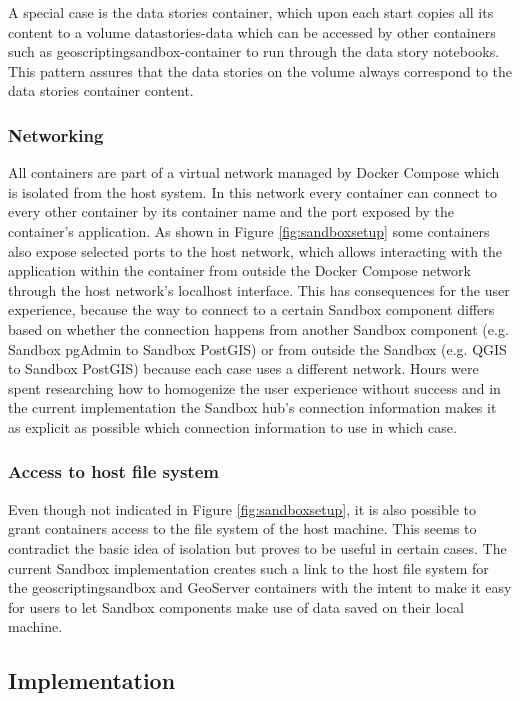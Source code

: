\documentclass[11pt, a4paper, oneside, parskip=full-]{scrartcl}
\begin{document}
A special case is the data stories container, which upon each start copies all
its content to a volume datastories-data which can be accessed by other
containers such as geoscriptingsandbox-container to run through the data story
notebooks. This pattern assures that the data stories on the volume always
correspond to the data stories container content.

\subsubsection*{Networking}
All containers are part of a virtual network managed by Docker Compose which is
isolated from the host system. In this network every container can connect to
every other container by its container name and the port exposed by the
container's application. As shown in Figure \ref{fig:sandboxsetup} some
containers also expose selected ports to the host network, which allows
interacting with the application within the container from outside the Docker
Compose network through the host network's localhost interface. This has
consequences for the user experience, because the way to connect to a certain
Sandbox component differs based on whether the connection happens from another
Sandbox component (e.g. Sandbox pgAdmin to Sandbox PostGIS) or from outside the
Sandbox (e.g. QGIS to Sandbox PostGIS) because each case uses a different
network. Hours were spent researching how to homogenize the user experience
without success and in the current implementation the Sandbox hub's connection
information makes it as explicit as possible which connection information to use
in which case.

\subsubsection*{Access to host file system}
Even though not indicated in Figure \ref{fig:sandboxsetup}, it is also possible
to grant containers access to the file system of the host machine. This seems to
contradict the basic idea of isolation but proves to be useful in certain cases.
The current Sandbox implementation creates such a link to the host file system
for the geoscriptingsandbox and GeoServer containers with the intent to make it
easy for users to let Sandbox components make use of data saved on their local
machine.

\subsection{Implementation}
\end{document}
